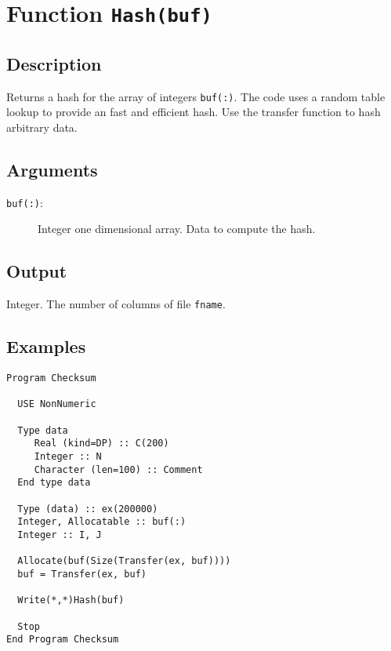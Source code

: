 \section{Function \texttt{Hash(buf)}}

\subsection{Description}

Returns a hash for the array of integers \texttt{buf(:)}. The code
uses a random table lookup to provide an fast and efficient hash. Use
the transfer function to hash arbitrary data.

\subsection{Arguments}

\begin{description}
\item[\texttt{buf(:)}: ] Integer one dimensional array. Data to
  compute the hash.
\end{description}

\subsection{Output}

Integer. The number of columns of file \texttt{fname}.

\subsection{Examples}

\begin{lstlisting}[emph=NumberOfColumns,
                   emphstyle=\color{blue},
                   frame=trBL,
                   caption=Checksum of data in a structure.,
                   label=nol]
Program Checksum
 
  USE NonNumeric
 
  Type data
     Real (kind=DP) :: C(200)
     Integer :: N
     Character (len=100) :: Comment
  End type data
 
  Type (data) :: ex(200000)
  Integer, Allocatable :: buf(:)
  Integer :: I, J
 
  Allocate(buf(Size(Transfer(ex, buf))))
  buf = Transfer(ex, buf)
 
  Write(*,*)Hash(buf)
 
  Stop
End Program Checksum
\end{lstlisting}

